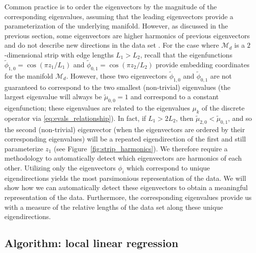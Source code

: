 \documentclass[preprint]{elsarticle}
\begin{document}
Common practice is to order the eigenvectors by the magnitude of the corresponding eigenvalues, assuming that the leading eigenvectors provide a parameterization of the underlying manifold.
%
However, as discussed in the previous section, some eigenvectors are higher harmonics of previous eigenvectors and do not describe new directions in the data set \cite{gerber2007robust}.
%
For the case where $\mathcal{M}_d$ is a $2$-dimensional strip with edge lengths $L_1  > L_2$,
recall that the eigenfunctions $\tilde{\phi}_{1,0} = \cos \left(  {\pi z_1}/{L_1} \right)$ and  $\tilde{\phi}_{0,1} = \cos \left(  {\pi z_2}/{L_2} \right)$ provide embedding coordinates for the manifold $\mathcal{M}_d$. 
%
However, these two eigenvectors $\tilde{\phi}_{1, 0}$ and $\tilde{\phi}_{0, 1}$ are not guaranteed to correspond to the two smallest (non-trivial) eigenvalues (the largest eigenvalue will always be $\tilde{\mu}_{0,0} = 1$ and correspond to a constant eigenfunction; these eigenvalues are related to the eigenvalues $\mu_k$ of the discrete operator via \eqref{eq:evals_relationship}). 
%
In fact, if $L_1 > 2 L_2$, then $\tilde{\mu}_{2, 0} < \tilde{\mu}_{0, 1}$, and so the second (non-trivial) eigenvector (when the eigenvectors are ordered by their corresponding eigenvalues) will be a repeated eigendirection of the first and still parameterize $z_1$ (see Figure~\ref{fig:strip_harmonics}).
%
We therefore require a methodology to automatically detect which eigenvectors are harmonics of each other. 
%
Utilizing only the eigenvectors $\phi_i$ which correspond to unique eigendirections yields the most parsimonious representation of the data.
%
We will show how we can automatically detect these eigenvectors to obtain a meaningful representation of the data.
%
Furthermore, the corresponding eigenvalues provide us with a measure of the relative lengths of the data set along these unique eigendirections. 


\subsection{Algorithm: local linear regression}
\end{document}
